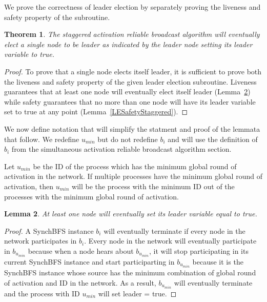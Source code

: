 \documentclass[english]{article}
\newtheorem{theorem}{Theorem}[section]
\newtheorem{lemma}[theorem]{Lemma}
\begin{document}
We prove the correctness of leader election by separately proving the liveness and safety property of the subroutine.

\begin{theorem}
\label{LeaderElectionStaggered}
The staggered activation reliable broadcast algorithm will eventually elect a single node to be leader as indicated by the leader node setting its leader variable to true.
\end{theorem}
\begin{proof}
To prove that a single node elects itself leader, it is sufficient to prove both the liveness and safety property of the given leader election subroutine. Liveness guarantees that at least one node will eventually elect itself leader (Lemma~\ref{LELivenessStaggered}) while safety guarantees that no more than one node will have its leader variable set to true at any point (Lemma~\ref{LESafetyStaggered}).

\end{proof}

We now define notation that will simplify the statment and proof of the lemmata that follow. We redefine $u_{min}$ but do not redefine $b_i$ and will use the definition of $b_i$ from the simultaneous activation reliable broadcast algorithm section.


\begin{definition}
Let $u_{min}$ be the ID of the process which has the minimum global round of activation in the network. If multiple processes have the minimum global round of activation, then $u_{min}$ will be the process with the minimum ID out of the processes with the minimum global round of activation.
\end{definition}


\begin{lemma}
\label{LELivenessStaggered}
 At least one node will eventually set its leader variable equal to true.
\end{lemma}
\begin{proof}

A SynchBFS instance $b_i$ will eventually terminate if every node in the network participates in $b_i$. 
Every node in the network will eventually participate in $b_{u_{min}}$ because when a node hears about $b_{u_{min}}$, it will stop participating in its current SynchBFS instance and start participarting in $b_{u_{min}}$ because it is the SynchBFS instance whose source has the minimum combination of global round of activation and ID in the network. As a result, $b_{u_{min}}$ will eventually terminate and the process with ID $u_{min}$ will set leader = true.
\end{proof}
\end{document}
